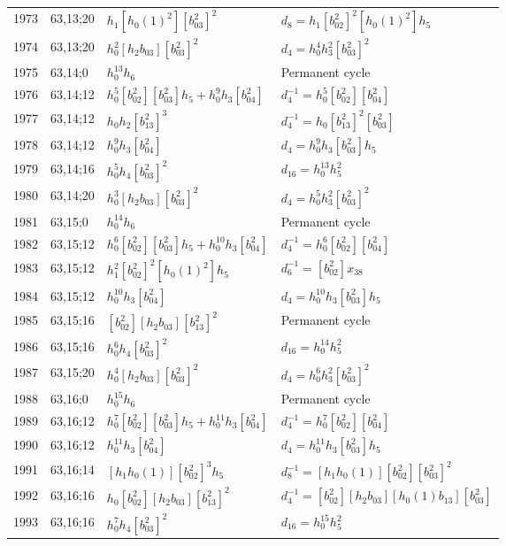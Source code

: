 \documentclass{article}
\begin{document}
\begin{longtable}{|l|l|>{\raggedright\arraybackslash}p{6cm}|>{\raggedright\arraybackslash}p{6cm}|}
\hline
1973 & 63,13;20 & $h_1[h_0(1)^2][b_{03}^2]^2$ &$d_{8}=h_1[b_{02}^2]^2[h_0(1)^2]h_5$\\
1974 & 63,13;20 & $h_0^2[h_2b_{03}][b_{03}^2]^2$ &$d_{4}=h_0^4h_3^2[b_{03}^2]^2$\\
\hline
1975 & 63,14;0 & $h_0^{13}h_6$ & Permanent cycle\\
\hline
1976 & 63,14;12 & $h_0^5[b_{02}^2][b_{03}^2]h_5 + h_0^9h_3[b_{04}^2]$ & $d_{4}^{-1}=h_0^5[b_{02}^2][b_{04}^2]$\\
1977 & 63,14;12 & $h_0h_2[b_{13}^2]^3$ & $d_{4}^{-1}=h_0[b_{13}^2]^2[b_{03}^2]$\\
1978 & 63,14;12 & $h_0^9h_3[b_{04}^2]$ &$d_{4}=h_0^9h_3[b_{03}^2]h_5$\\
\hline
1979 & 63,14;16 & $h_0^5h_4[b_{03}^2]^2$ &$d_{16}=h_0^{13}h_5^2$\\
\hline
1980 & 63,14;20 & $h_0^3[h_2b_{03}][b_{03}^2]^2$ &$d_{4}=h_0^5h_3^2[b_{03}^2]^2$\\
\hline
1981 & 63,15;0 & $h_0^{14}h_6$ & Permanent cycle\\
\hline
1982 & 63,15;12 & $h_0^6[b_{02}^2][b_{03}^2]h_5 + h_0^{10}h_3[b_{04}^2]$ & $d_{4}^{-1}=h_0^6[b_{02}^2][b_{04}^2]$\\
1983 & 63,15;12 & $h_1^2[b_{02}^2]^2[h_0(1)^2]h_5$ & $d_{6}^{-1}=[b_{02}^2]x_{38}$\\
1984 & 63,15;12 & $h_0^{10}h_3[b_{04}^2]$ &$d_{4}=h_0^{10}h_3[b_{03}^2]h_5$\\
\hline
1985 & 63,15;16 & $[b_{02}^2][h_2b_{03}][b_{13}^2]^2$ & Permanent cycle\\
1986 & 63,15;16 & $h_0^6h_4[b_{03}^2]^2$ &$d_{16}=h_0^{14}h_5^2$\\
\hline
1987 & 63,15;20 & $h_0^4[h_2b_{03}][b_{03}^2]^2$ &$d_{4}=h_0^6h_3^2[b_{03}^2]^2$\\
\hline
1988 & 63,16;0 & $h_0^{15}h_6$ & Permanent cycle\\
\hline
1989 & 63,16;12 & $h_0^7[b_{02}^2][b_{03}^2]h_5 + h_0^{11}h_3[b_{04}^2]$ & $d_{4}^{-1}=h_0^7[b_{02}^2][b_{04}^2]$\\
1990 & 63,16;12 & $h_0^{11}h_3[b_{04}^2]$ &$d_{4}=h_0^{11}h_3[b_{03}^2]h_5$\\
\hline
1991 & 63,16;14 & $[h_1h_0(1)][b_{02}^2]^3h_5$ & $d_{8}^{-1}=[h_1h_0(1)][b_{02}^2][b_{03}^2]^2$\\
\hline
1992 & 63,16;16 & $h_0[b_{02}^2][h_2b_{03}][b_{13}^2]^2$ & $d_{4}^{-1}=[b_{02}^2][h_2b_{03}][h_0(1)b_{13}][b_{03}^2]$\\
1993 & 63,16;16 & $h_0^7h_4[b_{03}^2]^2$ &$d_{16}=h_0^{15}h_5^2$\\

\end{longtable}
\end{document}
